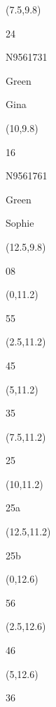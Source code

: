 \documentclass[a4paper]{article}
\newcommand{\myseat}[4]{%
\vspace{-0.1cm}
\parbox[t][2.2cm][t]{3.5cm}{
\small #1 %
\begin{description}
\vspace{-0.1cm}
\item [ID:] #2
\vspace{-0.1cm}
\item [Team:] #3 \normalsize
\vspace{-0.1cm}
\item \normalsize #4
\vspace{-0.1cm}
\end{description}
}
}
\begin{document}
\begin{CJK}{UTF8}{cyberbit}
\begin{textblock}{2.5}(7.5,9.8)
\myseat{24}{N9561731}{Green}{Gina}
\end{textblock}

\begin{textblock}{2.5}(10,9.8)
\myseat{16}{N9561761}{Green}{Sophie}
\end{textblock}

\begin{textblock}{2.5}(12.5,9.8)
\textblockcolor{}
\myseat{08}{}{}{}
\end{textblock}

\begin{textblock}{2.5}(0,11.2)
\textblockcolor{}
\myseat{55}{}{}{}
\end{textblock}

\begin{textblock}{2.5}(2.5,11.2)
\textblockcolor{}
\myseat{45}{}{}{}
\end{textblock}

\begin{textblock}{2.5}(5,11.2)
\textblockcolor{}
\myseat{35}{}{}{}
\end{textblock}

\begin{textblock}{2.5}(7.5,11.2)
\textblockcolor{}
\myseat{25}{}{}{}
\end{textblock}

\begin{textblock}{2.5}(10,11.2)
\textblockcolor{}
\myseat{25a}{}{}{}
\end{textblock}

\begin{textblock}{2.5}(12.5,11.2)
\textblockcolor{}
\myseat{25b}{}{}{}
\end{textblock}

\begin{textblock}{2.5}(0,12.6)
\textblockcolor{}
\myseat{56}{}{}{}
\end{textblock}

\begin{textblock}{2.5}(2.5,12.6)
\textblockcolor{}
\myseat{46}{}{}{}
\end{textblock}

\begin{textblock}{2.5}(5,12.6)
\textblockcolor{}
\myseat{36}{}{}{}
\end{textblock}


\end{CJK}
\end{document}

